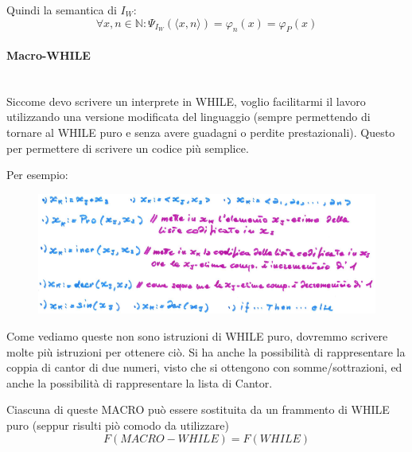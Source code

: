 \documentclass{article}
\begin{document}
Quindi la semantica di $I_W$:
$$\forall x,n\in\mathbb{N}:\Psi_{I_W}(\langle x,n\rangle)=\varphi_n(x)=\varphi_P(x)$$

\paragraph{Macro-WHILE}\mbox{}\\
Siccome devo scrivere un interprete in WHILE, voglio facilitarmi il lavoro utilizzando una
versione modificata del linguaggio (sempre permettendo di tornare al WHILE puro e senza
avere guadagni o perdite prestazionali). Questo per permettere di scrivere un codice
più semplice.

Per esempio:
\begin{figure}[H]
    \centering
    \includegraphics[scale=0.5]{images/macro-while.png}
\end{figure}

Come vediamo queste non sono istruzioni di WHILE puro, dovremmo scrivere molte più istruzioni
per ottenere ciò. Si ha anche la possibilità di rappresentare la coppia di cantor di due numeri,
visto che si ottengono con somme/sottrazioni, ed anche la possibilità di rappresentare la
lista di Cantor.

Ciascuna di queste MACRO può essere sostituita da un frammento di WHILE puro (seppur risulti piò comodo
da utilizzare)
$$F(MACRO-WHILE)=F(WHILE)$$








\end{document}
